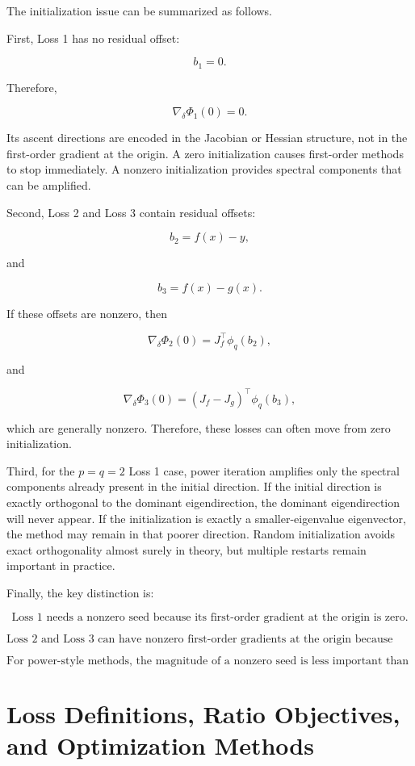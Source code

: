 \documentclass{article}
\begin{document}
The initialization issue can be summarized as follows.

First, Loss 1 has no residual offset:

\[
b_1=0.
\]

Therefore,

\[
\nabla_\delta\Phi_1(0)=0.
\]

Its ascent directions are encoded in the Jacobian or Hessian structure, not in the first-order gradient at the origin. A zero initialization causes first-order methods to stop immediately. A nonzero initialization provides spectral components that can be amplified.

Second, Loss 2 and Loss 3 contain residual offsets:

\[
b_2=f(x)-y,
\]

and

\[
b_3=f(x)-g(x).
\]

If these offsets are nonzero, then

\[
\nabla_\delta\Phi_2(0)=J_f^\top\phi_q(b_2),
\]

and

\[
\nabla_\delta\Phi_3(0)=(J_f-J_g)^\top\phi_q(b_3),
\]

which are generally nonzero. Therefore, these losses can often move from zero initialization.

Third, for the \(p=q=2\) Loss 1 case, power iteration amplifies only the spectral components already present in the initial direction. If the initial direction is exactly orthogonal to the dominant eigendirection, the dominant eigendirection will never appear. If the initialization is exactly a smaller-eigenvalue eigenvector, the method may remain in that poorer direction. Random initialization avoids exact orthogonality almost surely in theory, but multiple restarts remain important in practice.

Finally, the key distinction is:

\[
\boxed{
\text{Loss 1 needs a nonzero seed because its first-order gradient at the origin is zero.}
}
\]

\[
\boxed{
\text{Loss 2 and Loss 3 can have nonzero first-order gradients at the origin because they contain residual offsets.}
}
\]

\[
\boxed{
\text{For power-style methods, the magnitude of a nonzero seed is less important than its direction; for unnormalized gradient methods, the magnitude can affect the update size.}
}
\]

\section{Loss Definitions, Ratio Objectives, and Optimization Methods}
\end{document}
